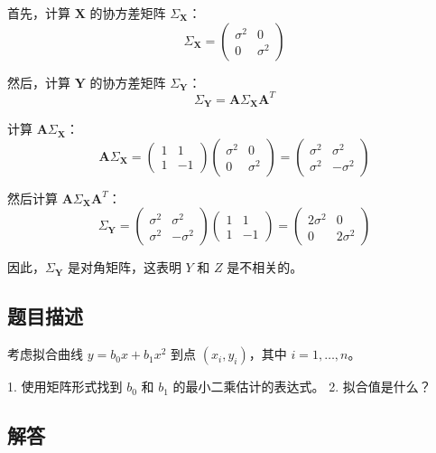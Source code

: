\documentclass[UTF8]{article}
\theoremstyle{MyLineTheoremStyle} %
\theoremstyle{MyBlockTheoremStyle} %
\theoremstyle{MySubsubsectionStyle} %
\begin{document}
首先，计算 $\mathbf{X}$ 的协方差矩阵 $\Sigma_{\mathbf{X}}$：
\[
\Sigma_{\mathbf{X}} = \begin{pmatrix} \sigma^2 & 0 \\ 0 & \sigma^2 \end{pmatrix}
\]

然后，计算 $\mathbf{Y}$ 的协方差矩阵 $\Sigma_{\mathbf{Y}}$：
\[
\Sigma_{\mathbf{Y}} = \mathbf{A} \Sigma_{\mathbf{X}} \mathbf{A}^T
\]

计算 $\mathbf{A} \Sigma_{\mathbf{X}}$：
\[
\mathbf{A} \Sigma_{\mathbf{X}} = \begin{pmatrix} 1 & 1 \\ 1 & -1 \end{pmatrix} \begin{pmatrix} \sigma^2 & 0 \\ 0 & \sigma^2 \end{pmatrix} = \begin{pmatrix} \sigma^2 & \sigma^2 \\ \sigma^2 & -\sigma^2 \end{pmatrix}
\]

然后计算 $\mathbf{A} \Sigma_{\mathbf{X}} \mathbf{A}^T$：
\[
\Sigma_{\mathbf{Y}} = \begin{pmatrix} \sigma^2 & \sigma^2 \\ \sigma^2 & -\sigma^2 \end{pmatrix} \begin{pmatrix} 1 & 1 \\ 1 & -1 \end{pmatrix} = \begin{pmatrix} 2\sigma^2 & 0 \\ 0 & 2\sigma^2 \end{pmatrix}
\]

因此，$\Sigma_{\mathbf{Y}}$ 是对角矩阵，这表明 $Y$ 和 $Z$ 是不相关的。






\subsection*{题目描述}

考虑拟合曲线 $y = b_0 x + b_1 x^2$ 到点 $(x_i, y_i)$，其中 $i = 1, \ldots, n$。

1. 使用矩阵形式找到 $b_0$ 和 $b_1$ 的最小二乘估计的表达式。
2. 拟合值是什么？

\subsection*{解答}
\end{document}
